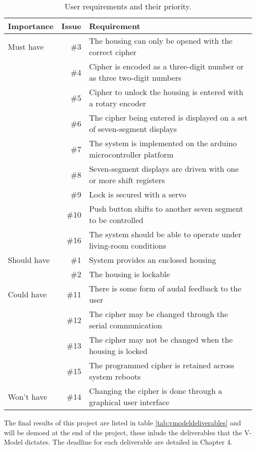 \begin{table}
\centering
\caption{User requirements and their priority.}
\begin{adjustwidth}{-1in}{1in}
\begin{tabular}{lrl}
\\
Importance & Issue & Requirement \\ \hline
\hline Must have
& \#3 & The housing can only be opened with the correct cipher \\
& \#4 & Cipher is encoded as a three-digit number or as three two-digit numbers \\
& \#5 & Cipher to unlock the housing is entered with a rotary encoder \\
& \#6 & The cipher being entered is displayed on a set of seven-segment displays \\
& \#7 & The system is implemented on the arduino microcontroller platform \\
& \#8 & Seven-segment displays are driven with one or more shift registers \\
& \#9 & Lock is secured with a servo \\
& \#10 & Push button shifts to another seven segment to be controlled \\
& \#16 & The system should be able to operate under living-room conditions \\
\hline Should have
& \#1 & System provides an enclosed housing \\
& \#2 & The housing is lockable \\
\hline Could have
& \#11 & There is some form of audal feedback to the user \\
& \#12 & The cipher may be changed through the serial communication \\
& \#13 & The cipher may not be changed when the housing is locked \\
& \#15 & The programmed cipher is retained across system reboots \\
\hline Won't have
& \#14 & Changing the cipher is done through a graphical user interface \\
\end{tabular}
\end{adjustwidth}
\label{tab:userrequirements}
\end{table}

The final results of this project are listed in table \ref{tab:vmodeldeliverables} and will be demoed at the end of the project, these inlude the deliverables that the V-Model dictates. The deadline for each deliverable are detailed in Chapter 4.

